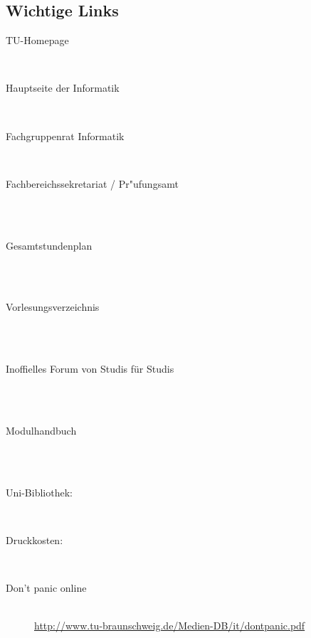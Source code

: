 \begin{multicols}{2}
\subsection*{Wichtige Links}
\begin{description}
  \item[TU-Homepage]~\\
 \item[Hauptseite der Informatik]~\\
 \item[Fachgruppenrat Informatik]~\\
 \item[Fachbereichssekretariat / Pr"ufungsamt]~\\
 \\
\item[Gesamtstundenplan]~\\\\
\item[Vorlesungsverzeichnis]~\\\\
\item[Inoffielles Forum von Studis für
  Studis]~\\\\
\item[Modulhandbuch]~\\\\
\item[Uni-Bibliothek:] ~\\
\item[Druckkosten:] ~\\
\item[Don't panic online] ~\\
{\footnotesize\url{http://www.tu-braunschweig.de/Medien-DB/it/dontpanic.pdf}}
\end{description}


\end{multicols}

